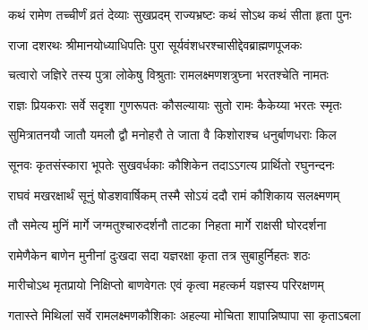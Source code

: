 

\storymeta





\twolineshloka
{कथं रामेण तच्चीर्णं व्रतं देव्याः सुखप्रदम्}
{राज्यभ्रष्टः कथं सोऽथ कथं सीता हृता पुनः}%



\twolineshloka
{राजा दशरथः श्रीमानयोध्याधिपतिः पुरा}
{सूर्यवंशधरश्चासीद्देवब्राह्मणपूजकः}%

\twolineshloka
{चत्वारो जज्ञिरे तस्य पुत्रा लोकेषु विश्रुताः}
{रामलक्ष्मणशत्रुघ्ना भरतश्चेति नामतः}%

\twolineshloka
{राज्ञः प्रियकराः सर्वे सदृशा गुणरूपतः}
{कौसल्यायाः सुतो रामः कैकेय्या भरतः स्मृतः}%

\twolineshloka
{सुमित्रातनयौ जातौ यमलौ द्वौ मनोहरौ}
{ते जाता वै किशोराश्च धनुर्बाणधराः किल}%

\twolineshloka
{सूनवः कृतसंस्कारा भूपतेः सुखवर्धकाः}
{कौशिकेन तदाऽऽगत्य प्रार्थितो रघुनन्दनः}%

\twolineshloka
{राघवं मखरक्षार्थं सूनुं षोडशवार्षिकम्}
{तस्मै सोऽयं ददौ रामं कौशिकाय सलक्ष्मणम्}%

\twolineshloka
{तौ समेत्य मुनिं मार्गे जग्मतुश्चारुदर्शनौ}
{ताटका निहता मार्गे राक्षसी घोरदर्शना}%

\twolineshloka
{रामेणैकेन बाणेन मुनीनां दुःखदा सदा}
{यज्ञरक्षा कृता तत्र सुबाहुर्निहतः शठः}%

\twolineshloka
{मारीचोऽथ मृतप्रायो निक्षिप्तो बाणवेगतः}
{एवं कृत्वा महत्कर्म यज्ञस्य परिरक्षणम्}%

\twolineshloka
{गतास्ते मिथिलां सर्वे रामलक्ष्मणकौशिकाः}
{अहल्या मोचिता शापान्निष्पापा सा कृताऽबला}%

